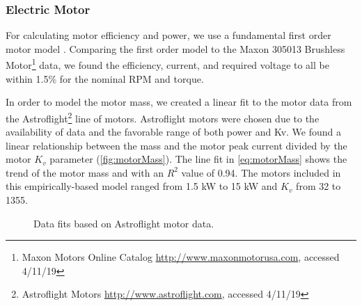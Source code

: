 \documentclass[conf]{new-aiaa}
\begin{document}
\subsubsection{Electric Motor}

\label{Motor}

For calculating motor efficiency and power, we use a fundamental first order motor model \cite{DrelaMotor}. Comparing the first order model to the Maxon 305013 Brushless Motor\footnote{Maxon Motors Online Catalog \href{https://www.maxonmotorusa.com/maxon/view/catalog/}{http://www.maxonmotorusa.com}, accessed 4/11/19} data, we found the efficiency, current, and required voltage to all be within 1.5\% for the nominal RPM and torque.


In order to model the motor mass, we created a linear fit to the motor data from the Astroflight\footnote{Astroflight Motors \href{http://www.astroflight.com}{http://www.astroflight.com}, accessed 4/11/19} line of motors. Astroflight motors were chosen due to the availability of data and the favorable range of both power and Kv. We found a linear relationship between the mass and the motor peak current divided by the motor $K_v$ parameter (\cref{fig:motorMass}). The line fit in \cref{eq:motorMass} shows the trend of the motor mass and with an $R^2$ value of 0.94. The motors included in this empirically-based model ranged from 1.5 kW to 15 kW and $K_v$ from 32 to 1355.

\begin{figure}[htbp]
    \centering
    \qquad
    \caption{Data fits based on Astroflight motor data.}
    \label{fig:motorempirical}
\end{figure}
\end{document}
